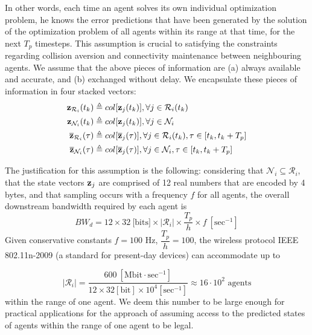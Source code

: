 In other words, each time an agent solves its own individual
optimization problem, he knows the error predictions that have been generated
by the solution of the optimization problem of all agents within
its range at that time, for the next $T_p$ timesteps. This assumption is
crucial to satisfying the constraints regarding collision aversion and
connectivity maintenance between neighbouring agents.
We assume that the above pieces of information are (a) always available and
accurate, and (b) exchanged without delay. We encapsulate these pieces of
information in four stacked vectors:
\begin{subequations}
\begin{align}
  \bm{\mathbf{z}}_{\mathcal{R}_i}(t_k) &\triangleq col[\bm{\mathbf{z}}_j(t_k)], \forall j \in \mathcal{R}_i(t_k) \\
  \bm{\mathbf{z}}_{\mathcal{N}_i}(t_k) &\triangleq col[\bm{\mathbf{z}}_j(t_k)], \forall j \in \mathcal{N}_i \\
  \overline{\bm{\mathbf{z}}}_{\mathcal{R}_i}(\tau) &\triangleq col[\overline{\bm{\mathbf{z}}}_j(\tau)], \forall j \in \mathcal{R}_i(t_k), \tau \in [t_k, t_k + T_p] \\
  \overline{\bm{\mathbf{z}}}_{\mathcal{N}_i}(\tau) &\triangleq col[\overline{\bm{\mathbf{z}}}_j(\tau)], \forall j \in \mathcal{N}_i, \tau \in [t_k, t_k + T_p]
\end{align}
\end{subequations}

\begin{bw_box}
\begin{remark}
The justification for this assumption is the following: considering that
$\mathcal{N}_i \subseteq \mathcal{R}_i$, that the state
vectors $\bm{\mathbf{z}}_j$ are comprised of 12 real numbers that are encoded by
4 bytes, and that sampling occurs with a frequency $f$ for all agents, the
overall downstream bandwidth required by each agent is
$$BW_d = 12 \times 32\ \text{[bits]} \times |\mathcal{R}_i| \times \dfrac{T_p}{h} \times f\ [\text{sec}^{-1}]$$
Given conservative constants $f = 100$ Hz, $\dfrac{T_p}{h} = 100$, the
wireless protocol IEEE 802.11n-2009 (a standard for present-day devices)
can accommodate up to

$$|\mathcal{R}_i| = \dfrac{600\ [\text{Mbit}\cdot \text{sec}^{-1}] }{12\times32[\text{bit}]\times10^4 [\text{sec}^{-1}]} \approx
16 \cdot 10^2 \text{ agents}$$ within the range of one agent.
We deem this number to be large enough for practical applications
for the approach of assuming access to the predicted states of agents
within the range of one agent to be legal.
\end{remark}
\end{bw_box}

